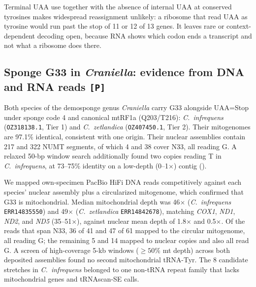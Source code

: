 \documentclass[11pt, a4paper]{article}
\begin{document}
Terminal UAA use together with the absence of internal UAA at conserved tyrosines makes widespread reassignment unlikely: a ribosome that read UAA as tyrosine would run past the stop of 11 or 12 of 13 genes. It leaves rare or context-dependent decoding open, because RNA shows which codon ends a transcript and not what a ribosome does there.

\subsection{Sponge G33 in \textit{Craniella}: evidence from DNA and RNA reads \texttt{[P]}}
Both species of the demosponge genus \textit{Craniella} carry G33 alongside UAA=Stop under sponge code 4 and canonical mtRF1a (Q203/T216): \textit{C.\ infrequens} (\texttt{OZ318138.1}, Tier 1) and \textit{C.\ zetlandica} (\texttt{OZ407450.1}, Tier 2). Their mitogenomes are 97.1\% identical, consistent with one origin. Their nuclear assemblies contain 217 and 322 NUMT segments, of which 4 and 38 cover N33, all reading G. A relaxed 50-bp window search additionally found two copies reading T in \textit{C.\ infrequens}, at 73--75\% identity on a low-depth (0--1$\times$) contig ().

We mapped own-specimen PacBio HiFi DNA reads competitively against each species' nuclear assembly plus a circularized mitogenome, which confirmed that G33 is mitochondrial. Median mitochondrial depth was 46$\times$ (\textit{C.\ infrequens} \texttt{ERR14835550}) and 49$\times$ (\textit{C.\ zetlandica} \texttt{ERR14842678}), matching \textit{COX1}, \textit{ND1}, \textit{ND2}, and \textit{ND5} (35--51$\times$), against nuclear mean depth of 1.8$\times$ and 0.5$\times$. Of the reads that span N33, 36 of 41 and 47 of 61 mapped to the circular mitogenome, all reading G; the remaining 5 and 14 mapped to nuclear copies and also all read G. A screen of high-coverage 5-kb windows ($\ge 50\%$ mt depth) across both deposited assemblies found no second mitochondrial tRNA-Tyr. The 8 candidate stretches in \textit{C.\ infrequens} belonged to one non-tRNA repeat family that lacks mitochondrial genes and tRNAscan-SE calls.
\end{document}
